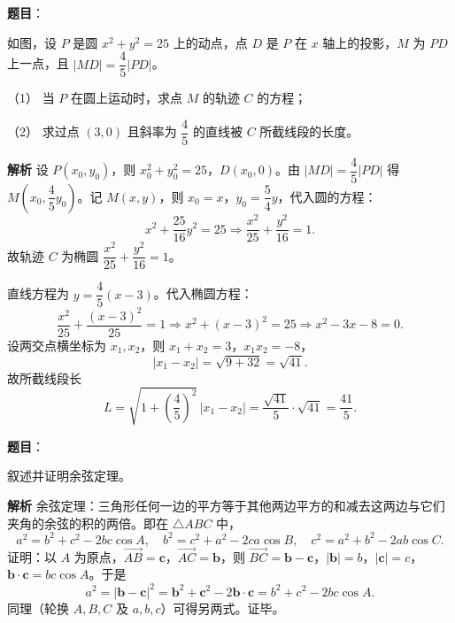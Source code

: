 \begin{answer}

\textbf{题目}：

如图，设 $P$ 是圆 $x^2+y^2=25$ 上的动点，点 $D$ 是 $P$ 在 $x$ 轴上的投影，$M$ 为 $PD$ 上一点，且 $|MD|=\dfrac45|PD|$。

（1） 当 $P$ 在圆上运动时，求点 $M$ 的轨迹 $C$ 的方程；

（2） 求过点 $(3,0)$ 且斜率为 $\dfrac45$ 的直线被 $C$ 所截线段的长度。
\nopagebreak[4]
\begin{center}\end{center}
\nopagebreak[4]
\textbf{解析}
设 $P(x_0,y_0)$，则 $x_0^2+y_0^2=25$，$D(x_0,0)$。由 $|MD|=\dfrac45|PD|$ 得 $M\left(x_0,\dfrac45y_0\right)$。记 $M(x,y)$，则 $x_0=x$，$y_0=\dfrac54y$，代入圆的方程：
\nopagebreak[4]
\[x^2+\frac{25}{16}y^2=25\Longrightarrow\frac{x^2}{25}+\frac{y^2}{16}=1.\]
故轨迹 $C$ 为椭圆 $\dfrac{x^2}{25}+\dfrac{y^2}{16}=1$。

直线方程为 $y=\dfrac45(x-3)$。代入椭圆方程：
\nopagebreak[4]
\[\frac{x^2}{25}+\frac{(x-3)^2}{25}=1\Longrightarrow x^2+(x-3)^2=25\Longrightarrow x^2-3x-8=0.\]
设两交点横坐标为 $x_1,x_2$，则 $x_1+x_2=3$，$x_1x_2=-8$，
\nopagebreak[4]
\[|x_1-x_2|=\sqrt{9+32}=\sqrt{41}.\]
故所截线段长
\nopagebreak[4]
\[L=\sqrt{1+\left(\frac45\right)^2}\,|x_1-x_2|=\frac{\sqrt{41}}5\cdot\sqrt{41}=\frac{41}5.\]



\end{answer}
\begin{answer}

\textbf{题目}：

叙述并证明余弦定理。

\textbf{解析}
余弦定理：三角形任何一边的平方等于其他两边平方的和减去这两边与它们夹角的余弦的积的两倍。即在 $\triangle ABC$ 中，
\nopagebreak[4]
\[a^2=b^2+c^2-2bc\cos A,\quad b^2=c^2+a^2-2ca\cos B,\quad c^2=a^2+b^2-2ab\cos C.\]
证明：以 $A$ 为原点，$\overrightarrow{AB}=\boldsymbol c$，$\overrightarrow{AC}=\boldsymbol b$，则 $\overrightarrow{BC}=\boldsymbol b-\boldsymbol c$，$|\boldsymbol b|=b$，$|\boldsymbol c|=c$，$\boldsymbol b\cdot\boldsymbol c=bc\cos A$。于是
\nopagebreak[4]
\[a^2=|\boldsymbol b-\boldsymbol c|^2=\boldsymbol b^2+\boldsymbol c^2-2\boldsymbol b\cdot\boldsymbol c=b^2+c^2-2bc\cos A.\]
同理（轮换 $A,B,C$ 及 $a,b,c$）可得另两式。证毕。


\end{answer}
